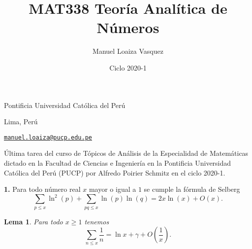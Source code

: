 \documentclass{article}
\title{MAT338 Teor\'ia Anal\'itica de N\'umeros}
\author{Manuel Loaiza Vasquez}
\date{Ciclo 2020-1}
\newenvironment{statement}[1]{\smallskip\noindent\color[rgb]{1.00,0.00,0.50} {\bf #1.}}{}
\newtheorem{lemma}[theorem]{Lema}
\theoremstyle{definition}
\theoremstyle{remark}
\begin{document}
\maketitle

\vspace*{-0.25in}
\centerline{Pontificia Universidad Cat\'olica del Per\'u}
\centerline{Lima, Per\'u}
\centerline{\href{mailto:manuel.loaiza@pucp.edu.pe}{{\tt manuel.loaiza@pucp.edu.pe}}}
\vspace*{0.15in}

\begin{framed}
\'Ultima tarea del curso de T\'opicos de An\'alisis de la Especialidad de Matem\'aticas dictado en la Facultad de Ciencias e Ingenier\'ia en la Pontificia Universidad Cat\'olica del Per\'u (PUCP) por Alfredo Poirier Schmitz en el ciclo 2020-1.
\end{framed}

\begin{statement}{1}
Para todo n\'umero real $x$ mayor o igual a $1$ se cumple la f\'ormula de Selberg
$$\sum_{p \leq x} \ln^2(p) + \sum_{pq \leq x} \ln(p) \ln(q) = 2x\ln(x) + O(x).$$
\end{statement}
 
\begin{lemma}
Para todo $x \geq 1$ tenemos
$$\sum_{n \leq x} \frac{1}{n} = \ln x + \gamma + O\left(\frac{1}{x}\right).$$
\end{lemma}
\end{document}
